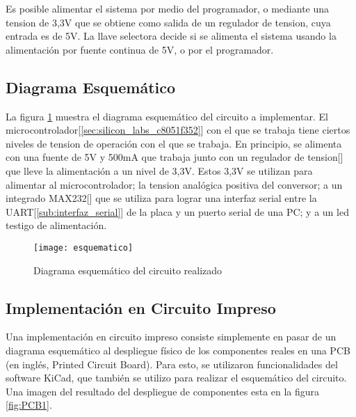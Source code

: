 Es posible alimentar el sistema por medio del programador, o mediante una tension de 3,3V que se obtiene como salida de un regulador de tension, cuya entrada es de 5V. La llave selectora decide si se alimenta el sistema usando la alimentación por fuente continua de 5V, o por el programador.




\subsection{Diagrama Esquemático} %
\label{sub:diagrama_esquematico}

La figura \ref{fig:esquematico} muestra el diagrama esquemático del circuito a implementar. El microcontrolador[\ref{sec:silicon_labs_c8051f352}] con el que se trabaja tiene ciertos niveles de tension de operación con el que se trabaja. En principio, se alimenta con una fuente de 5V y 500mA que trabaja junto con un regulador de tension[\cite{bib:lm2937}] que lleve la alimentación a un nivel de 3,3V. Estos 3,3V se utilizan para alimentar al microcontrolador; la tension analógica positiva del conversor; a un integrado MAX232[\cite{bib:max232}] que se utiliza para lograr una interfaz serial entre la UART[\ref{sub:interfaz_serial}] de la placa y un puerto serial de una PC; y a un led testigo de alimentación.

\begin{figure}[h]
  \centering
  \texttt{[image: esquematico]}
  \caption{\small Diagrama esquemático del circuito realizado}\label{fig:esquematico}
\end{figure}



\subsection{Implementación en Circuito Impreso} %
\label{sub:implementacion_en_circuito_impreso}

Una implementación en circuito impreso consiste simplemente en pasar de un diagrama esquemático al despliegue físico de los componentes reales en una PCB (en inglés, Printed Circuit Board). Para esto, se utilizaron funcionalidades del software KiCad, que también se utilizo para realizar el esquemático del circuito. Una imagen del resultado del despliegue de componentes esta en la figura \ref{fig:PCB1}.

